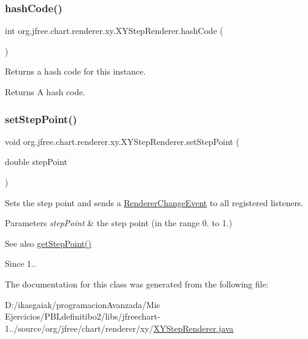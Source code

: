 \subsubsection{\texorpdfstring{hash\+Code()}{hashCode()}}
{\footnotesize\ttfamily int org.\+jfree.\+chart.\+renderer.\+xy.\+X\+Y\+Step\+Renderer.\+hash\+Code (\begin{DoxyParamCaption}{ }\end{DoxyParamCaption})}

Returns a hash code for this instance.

\begin{DoxyReturn}{Returns}
A hash code. 
\end{DoxyReturn}
\mbox{\label{classorg_1_1jfree_1_1chart_1_1renderer_1_1xy_1_1_x_y_step_renderer_a657a476c2702d644c93e754f73e5732a}} 
\subsubsection{\texorpdfstring{set\+Step\+Point()}{setStepPoint()}}
{\footnotesize\ttfamily void org.\+jfree.\+chart.\+renderer.\+xy.\+X\+Y\+Step\+Renderer.\+set\+Step\+Point (\begin{DoxyParamCaption}\item[{double}]{step\+Point }\end{DoxyParamCaption})}

Sets the step point and sends a \mbox{\hyperlink{}{Renderer\+Change\+Event}} to all registered listeners.


\begin{DoxyParams}{Parameters}
{\em step\+Point} & the step point (in the range 0. to 1.)\\
\hline
\end{DoxyParams}
\begin{DoxySeeAlso}{See also}
\mbox{\hyperlink{classorg_1_1jfree_1_1chart_1_1renderer_1_1xy_1_1_x_y_step_renderer_a4e528d2e25bd9b196bc6613432792fe7}{get\+Step\+Point()}}
\end{DoxySeeAlso}
\begin{DoxySince}{Since}
1.. 
\end{DoxySince}


The documentation for this class was generated from the following file\+:\begin{DoxyCompactItemize}
\item 
D\+:/ikasgaiak/programacion\+Avanzada/\+Mis Ejercicios/\+P\+B\+Ldefinitibo2/libs/jfreechart-\/1../source/org/jfree/chart/renderer/xy/\mbox{\hyperlink{_x_y_step_renderer_8java}{X\+Y\+Step\+Renderer.\+java}}\end{DoxyCompactItemize}
